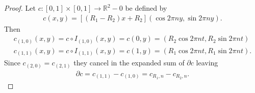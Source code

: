 \documentclass[20pt]{article}
\theoremstyle{plain}
\theoremstyle{definition}
\newcommand{\reals}{\mathbb{R}}
\begin{document}
\begin{proof}
  Let $c: [0, 1] \times [0,1] \to \reals^2 - 0$ be defined by
  \begin{align*}
    c(x, y) = [(R_1 - R_2)x + R_2](\cos2 \pi n y ,\sin2 \pi n y).
  \end{align*}
  Then
  \begin{align*}
    c_{(1, 0)}(x, y) =
    c \circ I_{(1, 0)}(x, y) =
    c(0, y) =
    (R_2 \cos 2 \pi n t, R_2 \sin 2 \pi n t) \\
    c_{(1, 1)}(x, y) =
    c \circ I_{(1, 1)}(x, y) =
    c(1, y) =
    (R_1 \cos 2 \pi n t, R_1 \sin 2 \pi n t).
  \end{align*}
  Since $c_{(2, 0)} = c_{(2, 1)}$ they cancel in the expanded sum of $\partial c$ leaving
  \begin{align*}
    \partial c = c_{(1, 1)} - c_{(1, 0)} = c_{R_1, n} - c_{R_2, n}.
  \end{align*}
\end{proof}
\end{document}
